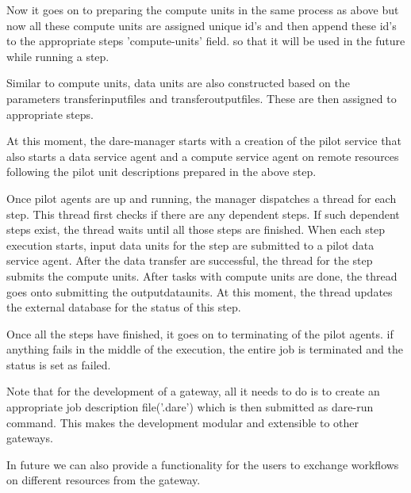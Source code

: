 \documentclass[]{svjour3}
\begin{document}
Now it goes on to preparing the compute units in the same process as above  but now all these compute units are assigned unique id's and then append these id's to the appropriate steps 'compute-units'  field. so that it will be used in the future while running a step.

Similar to compute units, data units are also constructed based on the parameters transfer\textunderscore input\textunderscore files and transfer\textunderscore output\textunderscore files. These are then assigned to appropriate steps.

At this moment, the dare-manager starts with a creation of the pilot service that also starts a data service agent and a compute service agent on remote resources following the pilot unit descriptions prepared in the above step.

Once pilot agents are up and running, the manager dispatches a thread for each step. This thread first checks if there are any dependent steps. If such dependent steps exist, the thread waits until all those steps are finished.  When each step execution starts, input data units for the step are submitted to a pilot data service agent.  After the data transfer are successful, the thread for the step submits the compute units.  After tasks with compute units are done, the thread goes onto submitting the output\textunderscore data\textunderscore units. At this moment, the thread updates the external database for the status of this step.

Once all the steps have finished, it goes on to terminating of the pilot agents. if anything fails in the middle of the execution, the entire job is terminated and the status is set as failed. 

Note that for the development of a gateway, all it needs to do is to create an appropriate job description file('.dare') which is then submitted as dare-run command. This makes the development modular and extensible to other gateways.

In future we can also provide a functionality for the users to exchange workflows on different resources from the gateway. 
\end{document}
